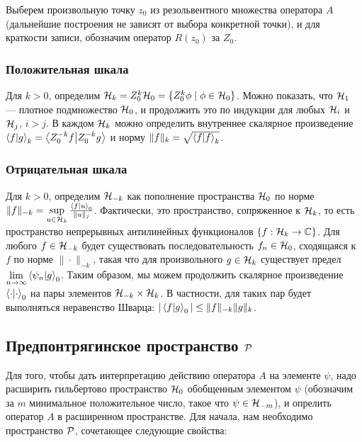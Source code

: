 Выберем произвольную точку $z_0$ из резольвентного множества оператора $A$ (дальнейшие построения не зависят от выбора конкретной точки), и для краткости записи, обозначим оператор $R(z_0)$ за $Z_0$.

\subsubsection{Положительная шкала}
Для $k > 0$, определим $\mathcal{H}_{k} = Z_0^k \mathcal{H}_{0} = \{ Z_0^k \phi \mid \phi \in \mathcal{H}_{0} \}$. Можно показать, что $\mathcal{H}_{1}$ — плотное подмножество $\mathcal{H}_{0}$, и продолжить это по индукции для любых $\mathcal{H}_{i}$ и $\mathcal{H}_{j}$, $i > j$. В каждом $\mathcal{H}_{k}$ можно определить внутреннее скалярное произведение $\ip{f}{g}_k = \ip{Z_0^{-k} f}{Z_0^{-k} g}$ и норму $\|f\|_k = \sqrt{\ip{f}{f}_k}$.

\subsubsection{Отрицательная шкала}
Для $k > 0$, определим $\mathcal{H}_{-k}$ как пополнение пространства $\mathcal{H}_{0}$ по норме $\|f \|_{-k} = \sup\limits_{u \in \hilb{k}} \frac{\ip{f}{u}_0}{\|u\|_j}$. Фактически, это пространство, сопряженное к $\mathcal{H}_{k}$, то есть пространство непрерывных антилинейных функционалов $\{ f: \mathcal{H}_{k} \to \mathbb{C} \}$. Для любого $f \in \mathcal{H}_{-k}$ будет существовать последовательность $f_n \in \mathcal{H}_{0}$, сходящаяся к $f$ по норме $\|\cdot\|_{-k}$, такая что для произвольного $g \in \mathcal{H}_{k}$ существует предел $\lim\limits_{n \to \infty} \ip{\psi_n}{g}_0$. Таким образом, мы можем продолжить скалярное произведение $\ipcdot_0$ на пары элементов $\mathcal{H}_{-k} \times \mathcal{H}_{k}$. В частности, для таких пар будет выполняться неравенство Шварца: $|\ip{f}{g}_0| \le \|f\|_{-k} \|g\|_k$.

\subsection{Предпонтрягинское пространство $\mathcal{P}$}
Для того, чтобы дать интерпретацию действию оператора $A$ на элементе $\psi$, надо расширить гильбертово пространство $\mathcal{H}_{0}$ обобщенным элементом $\psi$ (обозначим за $m$ минимальное положительное число, такое что $\psi \in \mathcal{H}_{-m}$), и опрелить оператор $A$ в расширенном пространстве. Для начала, нам необходимо пространство $\mathcal{P}$, сочетающее следующие свойства:

